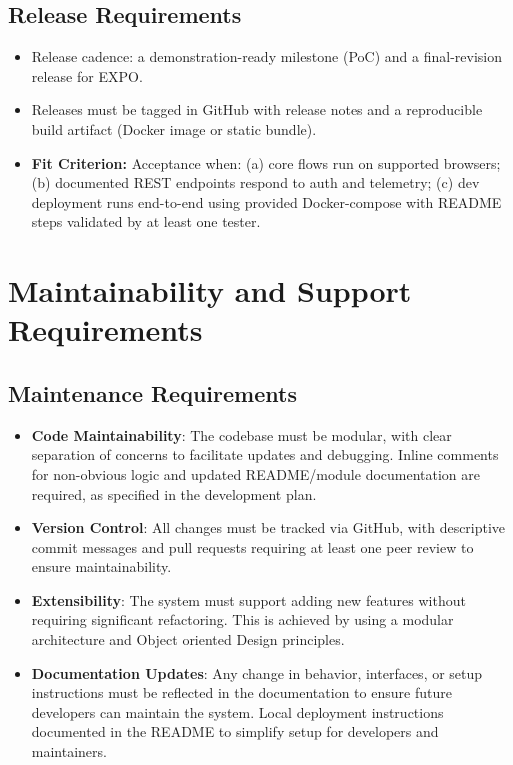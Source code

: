 \documentclass[12pt]{article}
\begin{document}
\subsection{Release Requirements}
\begin{itemize}
  \item Release cadence: a demonstration-ready milestone (PoC) and a final-revision release for EXPO.
  \item Releases must be tagged in GitHub with release notes and a reproducible build artifact (Docker image or static bundle). 
  \item \textbf{Fit Criterion:} Acceptance when: (a) core flows run on supported browsers; (b) documented REST endpoints respond to auth and telemetry; (c) dev deployment runs end-to-end using provided Docker-compose with README steps validated by at least one tester.
\end{itemize}

\section{Maintainability and Support Requirements}
\subsection{Maintenance Requirements}

\begin{itemize}
    \item \textbf{Code Maintainability}: The codebase must be modular, with clear separation of concerns to facilitate updates and debugging. Inline comments for non-obvious logic and updated README/module documentation are required, as specified in the development plan.
    \item \textbf{Version Control}: All changes must be tracked via GitHub, with descriptive commit messages and pull requests requiring at least one peer review to ensure maintainability.
    \item \textbf{Extensibility}: The system must support adding new features without requiring significant refactoring. This is achieved by using a modular architecture and Object oriented Design principles.
    \item \textbf{Documentation Updates}: Any change in behavior, interfaces, or setup instructions must be reflected in the documentation to ensure future developers can maintain the system. Local deployment instructions documented in the README to simplify setup for developers and maintainers.
\end{itemize}
\end{document}
